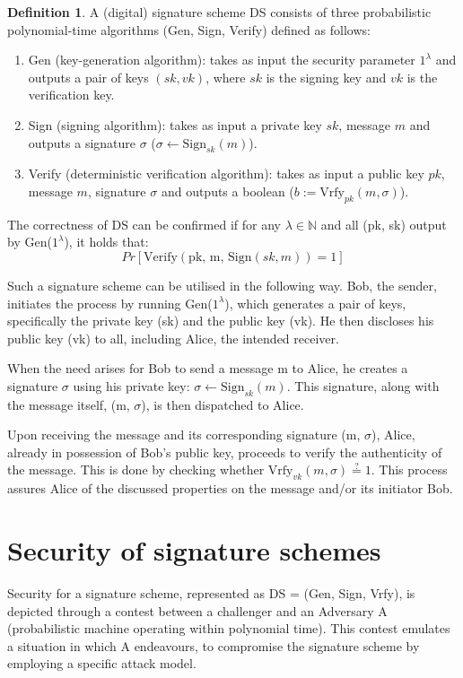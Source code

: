 \documentclass[]{final_report}
\theoremstyle{definition}
\newtheorem{definition}{Definition}[chapter]
\begin{document}
\begin{definition}
\label{def:digital signature}
A (digital) signature scheme DS consists of three probabilistic polynomial-time algorithms (Gen, Sign, Verify) defined as follows:
\begin{enumerate}
    \item Gen (key-generation algorithm): takes as input the security parameter $1^\lambda$ and outputs a pair of keys $(sk ,vk)$, where $sk$ is the signing key and $vk$ is the verification key.
    \item Sign (signing algorithm): takes as input a private key $sk$, message $m$ and outputs a signature $\sigma$ ($\sigma \leftarrow \text{Sign}_{sk}(m)$).
    \item Verify (deterministic verification algorithm):  takes as input a public key $pk$, message $m$, signature $\sigma$ and outputs a boolean ($b := \text{Vrfy}_{pk}(m, \sigma)$).
\end{enumerate}
\end{definition}

The correctness of DS can be confirmed if for any $\lambda \in \mathbb{N}$ and all (pk, sk) output by Gen($1^\lambda$), it holds that: 
\[ Pr[\text{Verify}(\text{pk, m, Sign}(sk, m)) = 1]\]
 
Such a signature scheme can be utilised in the following way.
Bob, the sender, initiates the process by running Gen($1^\lambda$), which generates a pair of keys, specifically the private key (sk) and the public key (vk). He then discloses his public key (vk) to all, including Alice, the intended receiver.

When the need arises for Bob to send a message m to Alice, he creates a signature $\sigma$ using his private key: $\sigma \leftarrow \text{Sign}_{sk}(m)$. This signature, along with the message itself, (m, $\sigma$), is then dispatched to Alice.

Upon receiving the message and its corresponding signature (m, $\sigma$), Alice, already in possession of Bob's public key, proceeds to verify the authenticity of the message. This is done by checking whether $\text{Vrfy}_{vk}(m, \sigma) \stackrel{?}{=} 1$. This process assures Alice of the discussed properties on the message and/or its initiator Bob.

\section{Security of signature schemes}
Security for a signature scheme, represented as DS = (Gen, Sign, Vrfy), is depicted through a contest between a challenger and an Adversary A (probabilistic machine operating within polynomial time). This contest emulates a situation in which A endeavours, to compromise the signature scheme by employing a specific attack model. 
\end{document}
